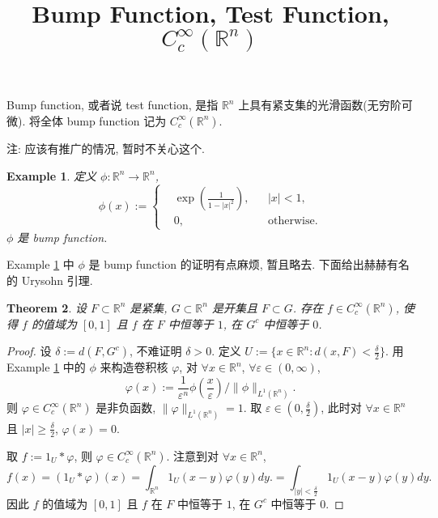 \documentclass[a4paper,11pt]{article}
\title{Bump Function, Test Function, $C_c^\infty(\mathbb{R}^n)$}
\newtheorem{theorem}{Theorem}[section]
\newtheorem{example}[theorem]{Example}
\theoremstyle{definition}
\begin{document}
\begin{CJK*}{UTF8}{gbsn}

\maketitle

Bump function, 或者说 test function, 是指 $ \mathbb{R}^n $ 上具有紧支集的光滑函数(无穷阶可微). 
将全体 bump function 记为 $ C_c^\infty(\mathbb{R}^n) $.

注: 应该有推广的情况, 暂时不关心这个.

\begin{example} \label{ex1}
    定义 $ \phi : \mathbb{R}^n \to \mathbb{R}^n $,
    $$
        \phi(x) := \left\{
        \begin{aligned}
            &\exp \left( \frac{1}{1-|x|^2} \right), && |x| < 1, \\
            &0, & & \text{otherwise}.
        \end{aligned} \right. 
    $$
    $ \phi $ 是 bump function.
\end{example}

Example \ref{ex1} 中 $ \phi $ 是 bump function 的证明有点麻烦, 暂且略去. 
下面给出赫赫有名的 Urysohn 引理.

\begin{theorem}
    设 $ F \subset \mathbb{R}^n $ 是紧集, $ G \subset \mathbb{R}^n $ 是开集且 $ F \subset G $.
    存在 $ f \in C_c^\infty(\mathbb{R}^n) $, 使得
    $ f $ 的值域为 $ [0, 1] $ 且 $ f $ 在 $ F $ 中恒等于 $ 1 $, 在 $ G^c $ 中恒等于 $ 0 $.
\end{theorem}

\begin{proof}
    设 $ \delta := d(F, G^c) $, 不难证明 $ \delta > 0 $. 
    定义 $ U := \{x \in \mathbb{R}^n : d(x, F) < \frac{\delta}{2} \} $.
    用 Example \ref{ex1} 中的 $ \phi $ 来构造卷积核 $ \varphi $, 
    对 $ \forall x \in \mathbb{R}^n $, $ \forall \varepsilon \in (0, \infty) $, 
    $$ 
        \varphi(x) := \frac{1}{\varepsilon^n} \phi \left(\frac{x}{\varepsilon}\right) / \|\phi\|_{L^1(\mathbb{R}^n)}.
    $$
    则 $ \varphi \in C_c^\infty(\mathbb{R}^n) $ 是非负函数, $ \|\varphi\|_{L^1(\mathbb{R}^n)} = 1 $.
    取 $ \varepsilon \in (0, \frac{\delta}{2}) $, 
    此时对 $ \forall x \in \mathbb{R}^n $ 且 $ |x| \geq \frac{\delta}{2} $,
    $ \varphi(x) = 0 $.
    
    取 $ f := \mathrm{1}_{U} * \varphi $, 则 $ \varphi \in C_c^\infty(\mathbb{R}^n) $.
    注意到对 $ \forall x \in \mathbb{R}^n $,
    $$
        f(x) = (\mathrm{1}_{U} * \varphi) (x) 
             =  \int_{\mathbb{R}^n} \mathrm{1}_{U}(x - y) \varphi(y) dy.
             =  \int_{|y| < \frac{\delta}{2}} \mathrm{1}_{U}(x - y) \varphi(y) dy.
    $$
    因此 $ f $ 的值域为 $ [0, 1] $ 且 $ f $ 在 $ F $ 中恒等于 $ 1 $, 在 $ G^c $ 中恒等于 $ 0 $.
\end{proof}

\end{CJK*}
\end{document}
